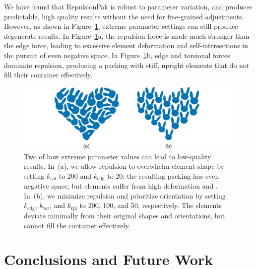 We have found that RepulsionPak is robust to parameter variation, and 
produces predictable, high quality results without the need for fine-grained
adjustments.  However, as shown in Figure~\ref{bad_results}, extreme parameter 
settings can still produce degenerate results.
In Figure~\ref{bad_results}a, the repulsion force is made much stronger than 
the edge force, leading to excessive element deformation and
self-intersections in the pursuit of even negative space.  In 
Figure~\ref{bad_results}b, edge and torsional forces dominate repulsion,
producing a packing with stiff, upright elements that do not fill their
container effectively.


\makeatletter %
\setlength{\@fptop}{0pt} %
\makeatother %
\begin{figure}
\centering
\includegraphics[width=1.0\textwidth]{figures/repulsionpak/bad_results.pdf} 
\vspace{-12pt}
\caption[Two examples of how extreme parameter values can lead to \newline 
	low-quality results]
	{\label{bad_results}
Two  of how extreme parameter values can lead to
	low-quality results.  In~(a), we allow repulsion to overwhelm element
	shape by setting $k_\mathrm{rpl}$ to 200 and $k_\mathrm{edg}$ to 20; the resulting packing 
	has even negative space, but elements suffer from high deformation
	and .  In~(b), we minimize repulsion and prioritize
	orientation by setting $k_\mathrm{edg}$, $k_\mathrm{tor}$, and $k_\mathrm{rpl}$ to 200, 100, and 50,
	respectively.  The elements deviate minimally from their original shapes 
	and orientations, but cannot fill the container effectively.
}
\end{figure}



\section{Conclusions and Future Work}
\label{repulsionpak_conclusions}

